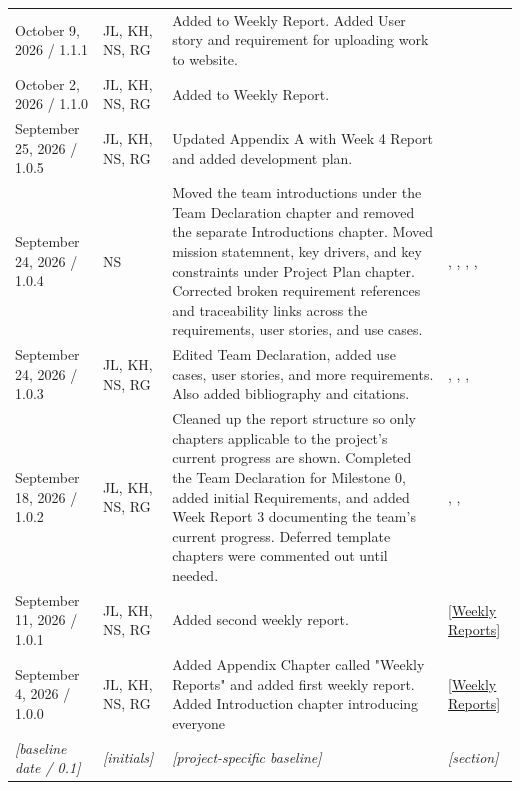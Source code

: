 \begin{tabularx}{\linewidth}{L{2.7cm}L{2.0cm}YL{1.8cm}}
October 9, 2026 / 1.1.1 & JL, KH, NS, RG &
Added to Weekly Report. Added User story and requirement for uploading work to website.    &
   \\

October 2, 2026 / 1.1.0 & JL, KH, NS, RG &
Added to Weekly Report. &
\\

September 25, 2026 / 1.0.5 & JL, KH, NS, RG &
Updated Appendix A with Week 4 Report and added development plan. &
 \\

September 24, 2026 / 1.0.4 & NS &
Moved the team introductions under the Team Declaration chapter and removed the separate Introductions chapter. Moved mission statemnent, key drivers, and key constraints under Project Plan chapter. Corrected broken requirement references and traceability links across the requirements, user stories, and use cases. &
,
,
, , \\

September 24, 2026 / 1.0.3 & JL, KH, NS, RG &
Edited Team Declaration, added use cases, user stories, and more requirements. Also added bibliography and citations.&
, , , \\

September 18, 2026 / 1.0.2 & JL, KH, NS, RG &
Cleaned up the report structure so only chapters applicable to the project's current progress are shown. Completed the Team Declaration for Milestone 0, added initial Requirements, and added Week Report 3 documenting the team's current progress. Deferred template chapters were commented out until needed. &
, ,
\\

September 11, 2026 / 1.0.1 & JL, KH, NS, RG & Added second weekly report. & \ref{Weekly Reports}\\

September 4, 2026 / 1.0.0 & JL, KH, NS, RG & Added Appendix Chapter called "Weekly Reports" and added first weekly report. Added Introduction chapter introducing everyone & \ref{Weekly Reports}\\
\textit{[baseline date / 0.1]} & \textit{[initials]} & \textit{[project-specific baseline]} & \textit{[section]}\\
\end{tabularx}
